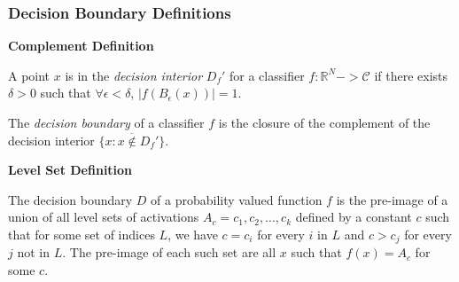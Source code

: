\begin{frame}
  \frametitle{Decision Boundary Definitions}
  
\textbf{Complement Definition}
\begin{definition}
 A point $x$ is in the \emph{decision interior} $D_f'$ for a classifier $f: \mathbb{R}^N -> \mathcal{C}$ if there exists $\delta > 0$ such that $\forall \epsilon < \delta$, $|f(B_\epsilon(x))| = 1$. 

 The \emph{decision boundary} of a classifier $f$ is the closure of the complement of the decision interior $\overline{\{x : x \notin D_f'\}}$. 
\end{definition}
 \textbf{Level Set Definition}

 \begin{definition}
   The decision boundary $D$ of a probability valued function $f$ is the pre-image of a union of all level sets of activations $A_c = {c_1, c_2, ..., c_k}$ defined by a constant $c$ such that for some set of indices $L$, we have $c = c_i$ for every $i$ in $L$ and $c > c_j$ for every $j$ not in $L$. The pre-image of each such set are all $x$ such that $f(x) = A_c$ for some $c$. 
 \end{definition}
 \end{frame}





